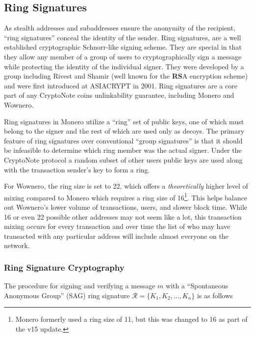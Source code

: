 \subsection{Ring Signatures}
As stealth addresses and subaddresses ensure the anonymity of the recipient, ``ring signatures'' conceal the identity of the sender\cite{moneropedia}. Ring signatures, are a well established cryptographic Schnorr-like\cite{schnorr_sig} signing scheme\cite{ringsig_wikipedia}. They are special in that they allow any member of a group of users to cryptographically sign a message while protecting the identity of the individual signer\cite{ringsig_wikipedia}. They were developed by a group including Rivest and Shamir (well known for the \textbf{RS}A encryption scheme) and were first introduced at ASIACRYPT in 2001\cite{ringsig_wikipedia}. Ring signatures are a core part of any CryptoNote coins unlinkability guarantee, including Monero and Wownero\cite{CryptoNote,moneropedia,wowrepo}.

Ring signatures in Monero utilize a ``ring'' set of public keys, one of which must belong to the signer and the rest of which are used only as decoys. The primary feature of ring signatures over conventional ``group signatures'' is that it should be infeasible to determine which ring member was the actual signer\cite{zero2monero}. Under the CryptoNote protocol a random subset of other users public keys are used along with the transaction sender's key to form a ring\cite{CryptoNight}. 

For Wownero, the ring size is set to 22, which offers a \emph{theoretically} higher level of mixing compared to Monero which requires a ring size of 16\footnote{Monero formerly used a ring size of 11, but this was changed to 16 as part of the v15 update\cite{monero_repo}.}\cite{moneropedia}. This helps balance out Wownero's lower volume of transactions, users, and slower block time. While 16 or even 22 possible other addresses may not seem like a lot, this transaction mixing occurs for every transaction and over time the list of who may have transacted with any particular address will include almost everyone on the network\cite{monerohow_privacy}.

\subsubsection{Ring Signature Cryptography}
The procedure for signing and verifying a message $m$ with a ``Spontaneous Anonymous Group'' (SAG) ring signature $\mathcal{R}=\{K_1,K_2,\dots,K_n\}$ is as follows

